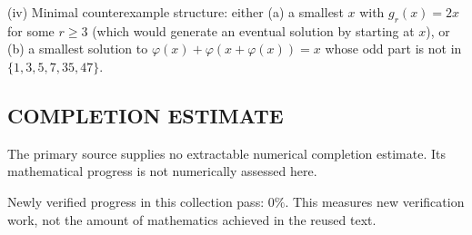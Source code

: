 (iv) Minimal counterexample structure: either (a) a smallest $x$ with $g_r(x)=2x$ for some $r\ge3$ (which would generate an eventual solution by starting at $x$), or (b) a smallest solution to $\varphi(x)+\varphi(x+\varphi(x))=x$ whose odd part is not in $\{1,3,5,7,35,47\}$.




\subsection*{COMPLETION ESTIMATE}
The primary source supplies no extractable numerical completion estimate. Its mathematical progress is not numerically assessed here.

Newly verified progress in this collection pass: $0\%$. This measures new verification work, not the amount of mathematics achieved in the reused text.
